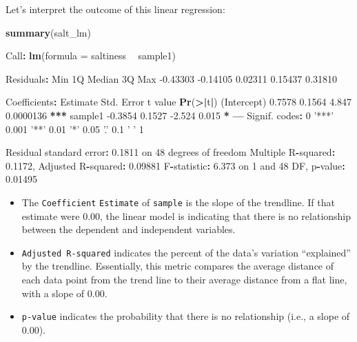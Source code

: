 \documentclass[
]{book}
\newenvironment{Shaded}{\begin{snugshade}}{\end{snugshade}}
\newcommand{\DataTypeTok}[1]{\textcolor[rgb]{0.13,0.29,0.53}{#1}}
\newcommand{\DecValTok}[1]{\textcolor[rgb]{0.00,0.00,0.81}{#1}}
\newcommand{\ErrorTok}[1]{\textcolor[rgb]{0.64,0.00,0.00}{\textbf{#1}}}
\newcommand{\FloatTok}[1]{\textcolor[rgb]{0.00,0.00,0.81}{#1}}
\newcommand{\KeywordTok}[1]{\textcolor[rgb]{0.13,0.29,0.53}{\textbf{#1}}}
\newcommand{\NormalTok}[1]{#1}
\newcommand{\OperatorTok}[1]{\textcolor[rgb]{0.81,0.36,0.00}{\textbf{#1}}}
\newcommand{\StringTok}[1]{\textcolor[rgb]{0.31,0.60,0.02}{#1}}
\begin{document}
Let's interpret the outcome of this linear regression:

\begin{Shaded}
\begin{Highlighting}[]
\KeywordTok{summary}\NormalTok{(salt_lm)}

\NormalTok{Call}\OperatorTok{:}
\KeywordTok{lm}\NormalTok{(}\DataTypeTok{formula =}\NormalTok{ saltiness }\OperatorTok{~}\StringTok{ }\NormalTok{sample1)}

\NormalTok{Residuals}\OperatorTok{:}
\StringTok{     }\NormalTok{Min       1Q   Median       3Q      Max }
\FloatTok{-0.43303} \FloatTok{-0.14105}  \FloatTok{0.02311}  \FloatTok{0.15437}  \FloatTok{0.31810} 

\NormalTok{Coefficients}\OperatorTok{:}
\StringTok{            }\NormalTok{Estimate Std. Error t value  }\KeywordTok{Pr}\NormalTok{(}\OperatorTok{>}\ErrorTok{|}\NormalTok{t}\OperatorTok{|}\NormalTok{)    }
\NormalTok{(Intercept)   }\FloatTok{0.7578}     \FloatTok{0.1564}   \FloatTok{4.847} \FloatTok{0.0000136} \OperatorTok{**}\ErrorTok{*}
\NormalTok{sample1      }\FloatTok{-0.3854}     \FloatTok{0.1527}  \FloatTok{-2.524}     \FloatTok{0.015} \OperatorTok{*}\StringTok{  }
\OperatorTok{---}
\NormalTok{Signif. codes}\OperatorTok{:}\StringTok{  }\DecValTok{0} \StringTok{'***'} \FloatTok{0.001} \StringTok{'**'} \FloatTok{0.01} \StringTok{'*'} \FloatTok{0.05} \StringTok{'.'} \FloatTok{0.1} \StringTok{' '} \DecValTok{1}

\NormalTok{Residual standard error}\OperatorTok{:}\StringTok{ }\FloatTok{0.1811}\NormalTok{ on }\DecValTok{48}\NormalTok{ degrees of freedom}
\NormalTok{Multiple R}\OperatorTok{-}\NormalTok{squared}\OperatorTok{:}\StringTok{  }\FloatTok{0.1172}\NormalTok{,    Adjusted R}\OperatorTok{-}\NormalTok{squared}\OperatorTok{:}\StringTok{  }\FloatTok{0.09881} 
\NormalTok{F}\OperatorTok{-}\NormalTok{statistic}\OperatorTok{:}\StringTok{ }\FloatTok{6.373}\NormalTok{ on }\DecValTok{1}\NormalTok{ and }\DecValTok{48}\NormalTok{ DF,  p}\OperatorTok{-}\NormalTok{value}\OperatorTok{:}\StringTok{ }\FloatTok{0.01495}
\end{Highlighting}
\end{Shaded}

\begin{itemize}
\item
  The \texttt{Coefficient} \texttt{Estimate} of \texttt{sample} is the slope of the trendline. If that estimate were 0.00, the linear model is indicating that there is no relationship between the dependent and independent variables.
\item
  \texttt{Adjusted\ R-squared} indicates the percent of the data's variation ``explained'' by the trendline. Essentially, this metric compares the average distance of each data point from the trend line to their average distance from a flat line, with a slope of 0.00.
\item
  \texttt{p-value} indicates the probability that there is no relationship (i.e., a slope of 0.00).
\end{itemize}
\end{document}
